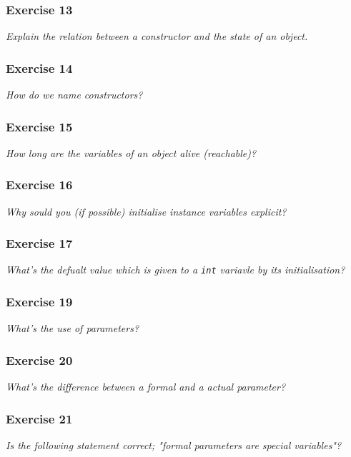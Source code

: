 \subsubsection*{Exercise 13}
\textit{Explain the relation between a constructor and the state of an 
	object.}\\

\subsubsection*{Exercise 14}
\textit{How do we name constructors?}\\

\subsubsection*{Exercise 15}
\textit{How long are the variables of an object alive (reachable)?}\\

\subsubsection*{Exercise 16}
\textit{Why sould you (if possible) initialise instance variables explicit?}\\

\subsubsection*{Exercise 17}
\textit{What's the defualt value which is given to a \lstinline{int} variavle
	by its initialisation?}\\

\subsubsection*{Exercise 19}
\textit{What's the use of parameters?}\\

\subsubsection*{Exercise 20}
\textit{What's the difference between a formal and a actual parameter?}\\

\subsubsection*{Exercise 21}
\textit{Is the following statement correct; "formal parameters are special
	variables"?}\\

